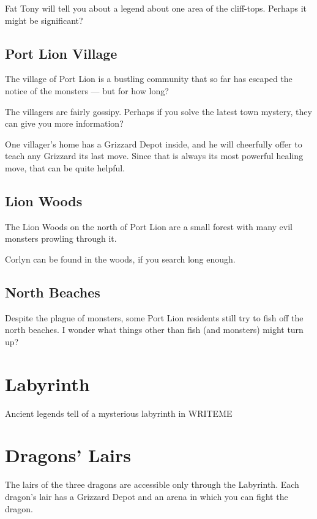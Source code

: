 \documentclass[10pt,twocolumn]{memoir}
\begin{document}
Fat  Tony will  tell  you about  a  legend  about one  area  of the  cliff-tops.
Perhaps it might be significant?

\subsection{Port Lion Village}

The village  of Port Lion is  a bustling community  that so far has  escaped the
notice of the monsters --- but for how long?

The villagers are fairly gossipy. Perhaps  if you solve the latest town mystery,
they can give you more information?

One villager's home has a Grizzard Depot inside, and he will cheerfully offer to
teach any Grizzard its last move. Since that is always its most powerful healing
move, that can be quite helpful.

\subsection{Lion Woods}

The Lion  Woods on  the north of  Port Lion  are a small  forest with  many evil
monsters prowling through it.

Corlyn can be found in the woods, if you search long enough.

\subsection{North Beaches}

Despite the plague of  monsters, some Port Lion residents still  try to fish off
the north  beaches. I wonder  what things other  than fish (and  monsters) might
turn up?

\section{Labyrinth}

Ancient legends tell of a mysterious labyrinth in WRITEME

\section{Dragons' Lairs}

The   lairs  of   the  three   dragons  are   accessible  only   through
the Labyrinth. Each  dragon's lair has a Grizzard Depot  and an arena in
which you can fight the dragon.
\end{document}
